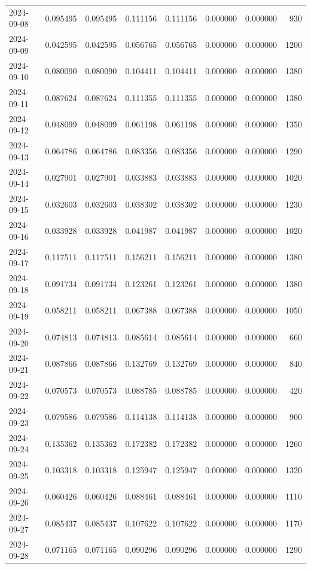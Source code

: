 \begin{tabular}{lrrrrrrr}
2024-09-08 & 0.095495 & 0.095495 & 0.111156 & 0.111156 & 0.000000 & 0.000000 & 930 \\
2024-09-09 & 0.042595 & 0.042595 & 0.056765 & 0.056765 & 0.000000 & 0.000000 & 1200 \\
2024-09-10 & 0.080090 & 0.080090 & 0.104411 & 0.104411 & 0.000000 & 0.000000 & 1380 \\
2024-09-11 & 0.087624 & 0.087624 & 0.111355 & 0.111355 & 0.000000 & 0.000000 & 1380 \\
2024-09-12 & 0.048099 & 0.048099 & 0.061198 & 0.061198 & 0.000000 & 0.000000 & 1350 \\
2024-09-13 & 0.064786 & 0.064786 & 0.083356 & 0.083356 & 0.000000 & 0.000000 & 1290 \\
2024-09-14 & 0.027901 & 0.027901 & 0.033883 & 0.033883 & 0.000000 & 0.000000 & 1020 \\
2024-09-15 & 0.032603 & 0.032603 & 0.038302 & 0.038302 & 0.000000 & 0.000000 & 1230 \\
2024-09-16 & 0.033928 & 0.033928 & 0.041987 & 0.041987 & 0.000000 & 0.000000 & 1020 \\
2024-09-17 & 0.117511 & 0.117511 & 0.156211 & 0.156211 & 0.000000 & 0.000000 & 1380 \\
2024-09-18 & 0.091734 & 0.091734 & 0.123261 & 0.123261 & 0.000000 & 0.000000 & 1380 \\
2024-09-19 & 0.058211 & 0.058211 & 0.067388 & 0.067388 & 0.000000 & 0.000000 & 1050 \\
2024-09-20 & 0.074813 & 0.074813 & 0.085614 & 0.085614 & 0.000000 & 0.000000 & 660 \\
2024-09-21 & 0.087866 & 0.087866 & 0.132769 & 0.132769 & 0.000000 & 0.000000 & 840 \\
2024-09-22 & 0.070573 & 0.070573 & 0.088785 & 0.088785 & 0.000000 & 0.000000 & 420 \\
2024-09-23 & 0.079586 & 0.079586 & 0.114138 & 0.114138 & 0.000000 & 0.000000 & 900 \\
2024-09-24 & 0.135362 & 0.135362 & 0.172382 & 0.172382 & 0.000000 & 0.000000 & 1260 \\
2024-09-25 & 0.103318 & 0.103318 & 0.125947 & 0.125947 & 0.000000 & 0.000000 & 1320 \\
2024-09-26 & 0.060426 & 0.060426 & 0.088461 & 0.088461 & 0.000000 & 0.000000 & 1110 \\
2024-09-27 & 0.085437 & 0.085437 & 0.107622 & 0.107622 & 0.000000 & 0.000000 & 1170 \\
2024-09-28 & 0.071165 & 0.071165 & 0.090296 & 0.090296 & 0.000000 & 0.000000 & 1290 \\

\end{tabular}

